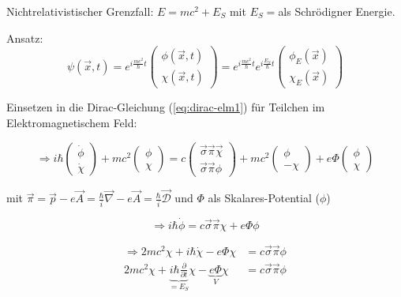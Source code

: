 Nichtrelativistischer Grenzfall: \(E=mc^2+E_S\) mit \(E_S=\)als Schrödigner Energie.

Ansatz: 
\[\psi(\vec x,t) = e^{i\frac{mc^2}{\hbar}t}\begin{pmatrix}\phi(\vec x,t)\\\chi(\vec x,t)\end{pmatrix} =  e^{i\frac{mc^2}{\hbar}t}  e^{i\frac{E_S}{\hbar}t} \begin{pmatrix}\phi_E(\vec x)\\\chi_E(\vec x)\end{pmatrix}\]

Einsetzen in die Dirac-Gleichung (\ref{eq:dirac-elm1}) für Teilchen im Elektromagnetischem Feld:

\[\Rightarrow i\hbar\begin{pmatrix}\dot \phi\\ \dot\chi\end{pmatrix} + mc^2\begin{pmatrix} \phi\\ \chi\end{pmatrix} = c \begin{pmatrix}\vec \sigma \vec \pi \vec \chi\\ \vec \sigma \vec \pi \phi\end{pmatrix}+mc^2\begin{pmatrix} \phi\\ -\chi\end{pmatrix}+e\Phi \begin{pmatrix} \phi\\ \chi\end{pmatrix}\]

mit \(\vec\pi = \vec p -e\vec A = \frac{\hbar}{i}\vec \nabla-e\vec A= \frac{\hbar}{i}\vec{\mathcal D} \) und \(\Phi\) als Skalares-Potential (\(\phi\))

\begin{equation} 
\Rightarrow i\hbar\dot\phi = c \vec\sigma\vec\pi\chi + e\Phi \phi
\label{eq:dirac-to-pauli-01}
\end{equation}

\begin{align}
\Rightarrow  2mc^2\chi+i\hbar \dot\chi - e\Phi \chi &= c\vec\sigma\vec\pi\phi \\
2mc^2\chi+\underbrace{i\hbar \frac{\partial}{\partial t}}_{=E_S}\chi - \underbrace{e\Phi}_{V} \chi &= c\vec\sigma\vec\pi\phi
\label{eq:dirac-to-pauli-02}
\end{align}



